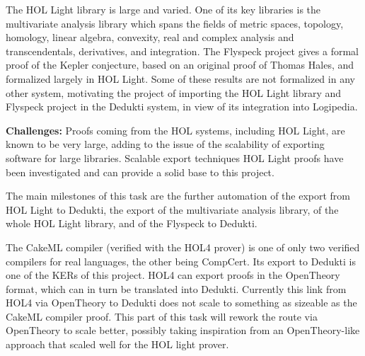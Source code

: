 \begin{workpackage}[id=libraries,type=RTD,wphases=1-48,
  short={Large libraries},%
  title={Large libraries},
  activity=na,
  lead=Tum,
  StrRM=18,
  ChaRM=12,
  TumRM=27]
\begin{tasklist}
\begin{task}[
  id=flyspeck,
  title=The Flyspeck library,
  shorttitle=Flyspeck,
  lead=Inr,
  wphases=1-36]
The {HOL Light} library is large and varied. One of its key libraries is the
multivariate analysis library
which spans the fields of metric spaces, topology, homology, linear algebra,
convexity, real and complex analysis and transcendentals, derivatives, and
integration. The {Flyspeck} project gives a formal proof of the {Kepler}
conjecture, based on an original proof of Thomas {Hales}, and formalized
largely in {HOL Light}.%
Some of these results are not formalized in any other system, motivating the
project of importing the {HOL Light} library and {Flyspeck} project in the
{Dedukti} system, in view of its integration into {Logipedia}.

\textbf{Challenges:} Proofs coming from the HOL systems, including
       {HOL Light}, are known to be very large, adding to the issue of
       the scalability of exporting software for large
       libraries. Scalable export techniques HOL Light proofs have
       been investigated and can provide a solid base to this project.

The main milestones of this task are the further automation of the export from
{HOL Light} to {Dedukti}, the export of the multivariate analysis library, of
the whole {HOL Light} library, and of the {Flyspeck} to {Dedukti}.
\end{task}

\begin{task}[
  id=cakeml,
  title=The CakeML compiler library,
  shorttitle=CakeML,
  lead=Cha,
  ChaRM=12,
  wphases=12-23]
%
The CakeML
compiler 
(verified with the HOL4 prover) is one of only two verified compilers for real
languages, the other being CompCert. Its export to Dedukti is one of
the KERs of this project.
%
HOL4 can export proofs in the OpenTheory format, which can in turn be
translated into Dedukti. Currently this link from HOL4 via OpenTheory
to Dedukti does not scale to something as sizeable as the CakeML
compiler proof. This part of this task will rework the route via
OpenTheory to scale better, possibly taking inspiration from an
OpenTheory-like approach that scaled well for the HOL light
prover.


\end{task}
\end{tasklist}
\end{workpackage}
